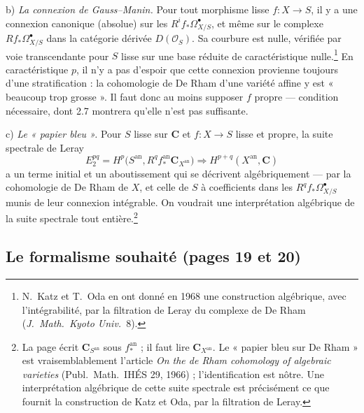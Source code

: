 \documentclass[11pt,a4paper]{article}
\begin{document}
b) \emph{La connexion de Gauss--Manin.} Pour tout morphisme lisse
$f : X \to S$, il y a une connexion canonique (absolue) sur les
$R^if_*\Omega^\bullet_{X/S}$, et même sur le complexe
$Rf_*\Omega^\bullet_{X/S}$ dans la catégorie dérivée $D(\mathcal{O}_S)$. Sa
courbure est nulle, vérifiée par voie transcendante pour $S$ lisse sur une base
réduite de caractéristique nulle.\footnote{N.~Katz et T.~Oda en ont donné
en 1968 une construction algébrique, avec l'intégrabilité, par la
filtration de Leray du complexe de De Rham (\emph{J.~Math.\ Kyoto Univ.}~8).} En
caractéristique $p$, il n'y a pas d'espoir que cette connexion provienne
toujours d'une stratification : la cohomologie de De Rham d'une variété
affine y est « beaucoup trop grosse ». Il faut donc au moins supposer $f$
propre — condition nécessaire, dont 2.7 montrera qu'elle n'est pas
suffisante.

c) \emph{Le « papier bleu ».} Pour $S$ lisse sur $\mathbf{C}$ et $f : X \to S$
lisse et propre, la suite spectrale de Leray
\[
  E_2^{pq} = H^p\bigl(S^{\mathrm{an}}, R^qf^{\mathrm{an}}_*\mathbf{C}_{X^{\mathrm{an}}}\bigr)
  \Longrightarrow H^{p+q}(X^{\mathrm{an}}, \mathbf{C})
\]
a un terme initial et un aboutissement qui se décrivent algébriquement — par la
cohomologie de De Rham de $X$, et celle de $S$ à coefficients dans les
$R^qf_*\Omega^\bullet_{X/S}$ munis de leur connexion intégrable. On voudrait
une interprétation algébrique de la suite spectrale tout entière.\footnote{La
page écrit $\mathbf{C}_{S^{\mathrm{an}}}$ sous $f^{\mathrm{an}}_*$ ; il faut
lire $\mathbf{C}_{X^{\mathrm{an}}}$. Le « papier bleu sur De Rham » est
vraisemblablement l'article \emph{On the de Rham cohomology of algebraic
varieties} (Publ.\ Math.\ IHÉS 29, 1966) ; l'identification est nôtre. Une
interprétation algébrique de cette suite spectrale est précisément ce que
fournit la construction de Katz et Oda, par la filtration de Leray.}

\subsection*{Le formalisme souhaité (pages 19 et 20)}
\end{document}
